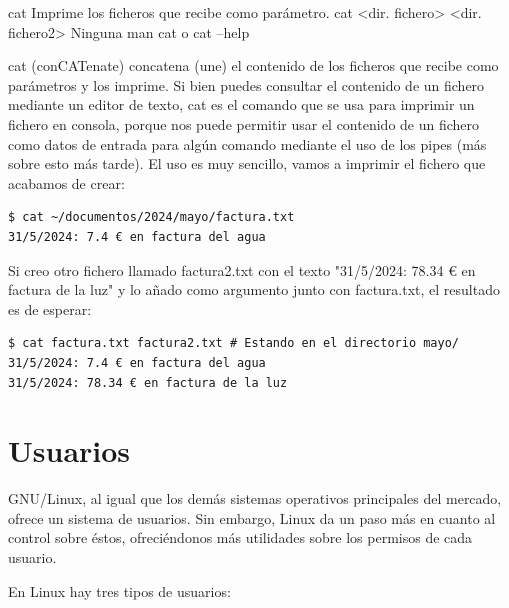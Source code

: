\begin{command-info}
{cat}
{Imprime los ficheros que recibe como parámetro.}
{cat <dir. fichero> <dir. fichero2>}
{Ninguna}
{man cat o cat --help}
\end{command-info}

cat (conCATenate) concatena (une) el contenido de los ficheros que recibe como parámetros y los imprime. Si bien puedes consultar el contenido de un fichero mediante un editor de texto, cat es el comando que se usa para imprimir un fichero en consola, porque nos puede permitir usar el contenido de un fichero como datos de entrada para algún comando mediante el uso de los pipes (más sobre esto más tarde). El uso es muy sencillo, vamos a imprimir el fichero que acabamos de crear:

\begin{tcolorbox-code}
\begin{lstlisting}
$ cat ~/documentos/2024/mayo/factura.txt
31/5/2024: 7.4 € en factura del agua
\end{lstlisting}
\end{tcolorbox-code}

Si creo otro fichero llamado factura2.txt con el texto "31/5/2024: 78.34 € en factura de la luz" y lo añado como argumento junto con factura.txt, el resultado es de esperar:

\begin{tcolorbox-code}
\begin{lstlisting}
$ cat factura.txt factura2.txt # Estando en el directorio mayo/
31/5/2024: 7.4 € en factura del agua
31/5/2024: 78.34 € en factura de la luz
\end{lstlisting}
\end{tcolorbox-code}

\section{Usuarios}
GNU/Linux, al igual que los demás sistemas operativos principales del mercado, ofrece un sistema de usuarios. Sin embargo, Linux da un paso más en cuanto al control sobre éstos, ofreciéndonos más utilidades sobre los permisos de cada usuario.

En Linux hay tres tipos de usuarios:


